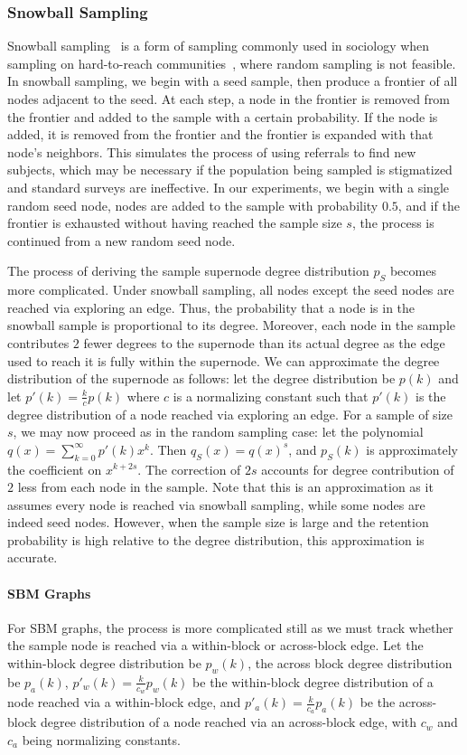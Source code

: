 \subsubsection{Snowball Sampling}

Snowball sampling~\cite{goodman1961snowball} is a form of sampling commonly used in sociology when sampling on hard-to-reach communities~\cite{hu2013survey}, where random sampling is not feasible.
In snowball sampling, we begin with a seed sample, then produce a frontier of all nodes adjacent to the seed. At each step, a node in the frontier is removed from the frontier and added to the sample with a certain probability. If the node is added, it is removed from the frontier and the frontier is expanded with that node's neighbors. This simulates the process of using referrals to find new subjects, which may be necessary if the population being sampled is stigmatized and standard surveys are ineffective. In our experiments, we begin with a single random seed node, nodes are added to the sample with probability $0.5$, and if the frontier is exhausted without having reached the sample size $s$, the process is continued from a new random seed node.

The process of deriving the sample supernode degree distribution $p_S$ becomes more complicated.
Under snowball sampling, all nodes except the seed nodes are reached via exploring an edge. Thus, the probability that a node is in the snowball sample is proportional to its degree. Moreover, each node in the sample contributes $2$ fewer degrees to the supernode than its actual degree as the edge used to reach it is fully within the supernode. We can approximate the degree distribution of the supernode as follows: let the degree distribution be $p(k)$ and let $p'(k) = \frac{k}{c}p(k)$ where $c$ is a normalizing constant such that $p'(k)$ is the degree distribution of a node reached via exploring an edge. For a sample of size $s$, we may now proceed as in the random sampling case: let the polynomial $q(x) = \sum_{k=0}^\infty p'(k)x^k$. Then $q_S(x) = q(x)^s$, and $p_S(k)$ is approximately the coefficient on $x^{k+2s}$. The correction of $2s$ accounts for degree contribution of $2$ less from each node in the sample. Note that this is an approximation as it assumes every node is reached via snowball sampling, while some nodes are indeed seed nodes. However, when the sample size is large and the retention probability is high relative to the degree distribution, this approximation is accurate.


\paragraph{SBM Graphs} For SBM graphs, the process is more complicated still as we must track whether the sample node is reached via a within-block or across-block edge. Let the within-block degree distribution be $p_w(k)$, the across block degree distribution be $p_a(k)$, $p'_w(k) = \frac{k}{c_w}p_w(k)$ be the within-block degree distribution of a node reached via a within-block edge, and $p'_a(k) = \frac{k}{c_a}p_a(k)$ be the across-block degree distribution of a node reached via an across-block edge, with $c_w$ and $c_a$ being normalizing constants.

